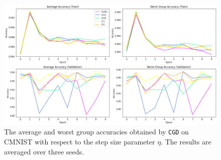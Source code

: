 \begin{figure}[H]
   \includegraphics[width=\textwidth]{media/cmnist-hyp-eta.png}
   \centering
   \caption{The average and worst group accuracies obtained by \texttt{CGD} on CMNIST with respect to the step size parameter $\eta$. The results are averaged over three seeds.}
   \label{fig:cmnist_hyp_eta}
\end{figure}